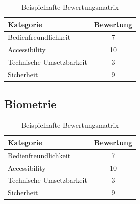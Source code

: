 \begin{table}[h!]
    \caption{Beispielhafte Bewertungsmatrix}
    \begin{center}
        \begin{tabular}{l|c}
            Kategorie                       & Bewertung \\\hline
            Bedienfreundlichkeit                         & 7         \\
            Accessibility                   & 10        \\
            Technische Umsetzbarkeit        & 3         \\
            Sicherheit                      & 9         
        \end{tabular}
    \end{center}
\end{table}

\subsection{Biometrie}

\begin{table}[h!]
    \caption{Beispielhafte Bewertungsmatrix}
    \begin{center}
        \begin{tabular}{l|c}
            Kategorie                       & Bewertung \\\hline
            Bedienfreundlichkeit                         & 7         \\
            Accessibility                   & 10        \\
            Technische Umsetzbarkeit        & 3         \\
            Sicherheit                      & 9         
        \end{tabular}
    \end{center}
\end{table}